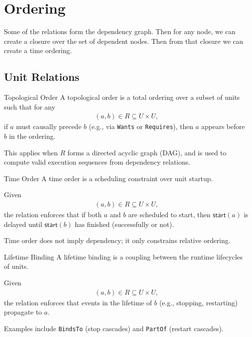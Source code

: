 \documentclass[openany, 12pt]{book}
\begin{document}
\chapter{Ordering}

Some of the relations form the dependency graph. Then for any node, we can
create a closure over the set of dependent nodes. Then from that closure we can
create a time ordering.

\section{Unit Relations}

\begin{definition}{Topological Order}{}
  A topological order is a total ordering over a subset of units such that for
  any
  \begin{align*}
    (a, b) \in R \subseteq U \times U,
  \end{align*}
  if $a$ must causally precede $b$ (e.g., via \texttt{Wants} or \texttt{Requires}),
  then $a$ appears before $b$ in the ordering.

  This applies when $R$ forms a directed acyclic graph (DAG), and is used to
  compute valid execution sequences from dependency relations.
\end{definition}

\begin{definition}{Time Order}{}
  A time order is a scheduling constraint over unit startup.

  Given
  \begin{align*}
    (a, b) \in R \subseteq U \times U,
  \end{align*}
  the relation enforces that if both $a$ and $b$ are scheduled to start, then
  $\mathsf{start}(a)$ is delayed until $\mathsf{start}(b)$ has finished
  (successfully or not).

  Time order does not imply dependency; it only constrains relative ordering.
\end{definition}

\begin{definition}{Lifetime Binding}{}
  A lifetime binding is a coupling between the runtime lifecycles of units.

  Given
  \begin{align*}
    (a, b) \in R \subseteq U \times U,
  \end{align*}
  the relation enforces that events in the lifetime of $b$ (e.g., stopping,
  restarting) propagate to $a$.

  Examples include \texttt{BindsTo} (stop cascades) and \texttt{PartOf}
  (restart cascades).
\end{definition}
\end{document}

